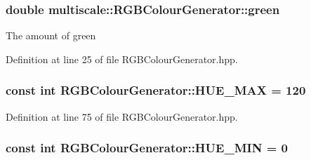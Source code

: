 \hypertarget{classmultiscale_1_1RGBColourGenerator_ae8d94d24b109954be1da2a04c8ec9af7}{
\subsubsection[{green}]{\setlength{\rightskip}{0pt plus 5cm}double {\bf multiscale\-::\-R\-G\-B\-Colour\-Generator\-::green}}}\label{classmultiscale_1_1RGBColourGenerator_ae8d94d24b109954be1da2a04c8ec9af7}
\-The amount of green 

\-Definition at line 25 of file \-R\-G\-B\-Colour\-Generator.\-hpp.

\hypertarget{classmultiscale_1_1RGBColourGenerator_a282d986019f3c02b46c122badf806cd0}{
\subsubsection[{\-H\-U\-E\-\_\-\-M\-A\-X}]{\setlength{\rightskip}{0pt plus 5cm}const int {\bf \-R\-G\-B\-Colour\-Generator\-::\-H\-U\-E\-\_\-\-M\-A\-X} = 120}}\label{classmultiscale_1_1RGBColourGenerator_a282d986019f3c02b46c122badf806cd0}


\-Definition at line 75 of file \-R\-G\-B\-Colour\-Generator.\-hpp.

\hypertarget{classmultiscale_1_1RGBColourGenerator_ae31c47c9fccf50b3688728126040bc23}{
\subsubsection[{\-H\-U\-E\-\_\-\-M\-I\-N}]{\setlength{\rightskip}{0pt plus 5cm}const int {\bf \-R\-G\-B\-Colour\-Generator\-::\-H\-U\-E\-\_\-\-M\-I\-N} = 0}}\label{classmultiscale_1_1RGBColourGenerator_ae31c47c9fccf50b3688728126040bc23}


